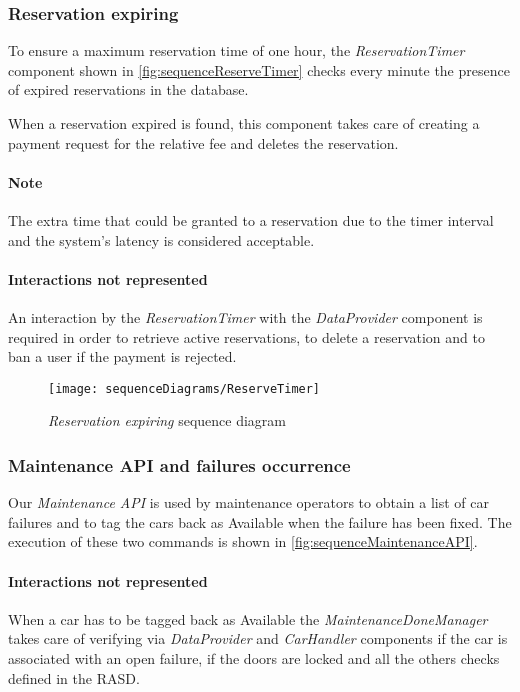 \subsubsection{Reservation expiring}
To ensure a maximum reservation time of one hour, the \emph{ReservationTimer} component shown in \autoref{fig:sequenceReserveTimer} checks every minute the presence of expired reservations in the database. 

When a reservation expired is found, this component takes care of creating a payment request for the relative fee and deletes the reservation. 

\paragraph{Note}The extra time that could be granted to a reservation due to the timer interval and the system's latency is considered acceptable.

\paragraph{Interactions not represented} An interaction by the \emph{ReservationTimer} with the \emph{DataProvider} component is required in order to retrieve active reservations, to delete a reservation and to ban a user if the payment is rejected.
\begin{figure}[h!]
	\centering
	\texttt{[image: sequenceDiagrams/ReserveTimer]}
	\caption{
		\label{fig:sequenceReserveTimer} 
		\emph{Reservation expiring} sequence diagram
	}
\end{figure}

\clearpage
\subsubsection{Maintenance API and failures occurrence}
Our \emph{Maintenance API} is used by maintenance operators to obtain a list of car failures and to tag the cars back as Available when the failure has been fixed. The execution of these two commands is shown in \autoref{fig:sequenceMaintenanceAPI}.
\paragraph{Interactions not represented}When a car has to be tagged back as \mbox{Available} the \emph{MaintenanceDoneManager} takes care of verifying via \emph{DataProvider} and \emph{CarHandler} components if the car is associated with an open failure, if the doors are locked and all the others checks defined in the RASD\cite{RASD}.

